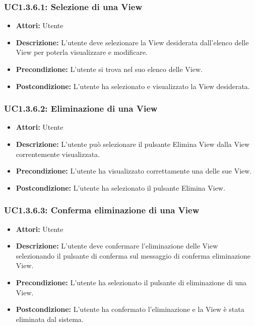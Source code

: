 \subsubsection{UC1.3.6.1: Selezione di una View}

\begin{itemize}
    \item \textbf{Attori:} Utente
    \item \textbf{Descrizione:} L'utente deve selezionare la View desiderata dall'elenco delle View per poterla visualizzare e modificare.
    \item \textbf{Precondizione:} L'utente si trova nel suo elenco delle View.
    \item \textbf{Postcondizione:} L'utente ha selezionato e visualizzato la View desiderata.
\end{itemize}

\subsubsection{UC1.3.6.2: Eliminazione di una View}

\begin{itemize}
    \item \textbf{Attori:} Utente
    \item \textbf{Descrizione:} L'utente può selezionare il pulsante Elimina View dalla View correntemente visualizzata.
    \item \textbf{Precondizione:} L'utente ha visualizzato correttamente una delle sue View.
    \item \textbf{Postcondizione:} L'utente ha selezionato il pulsante Elimina View.
\end{itemize}

\subsubsection{UC1.3.6.3: Conferma eliminazione di una View}

\begin{itemize}
    \item \textbf{Attori:} Utente
    \item \textbf{Descrizione:} L'utente deve confermare l'eliminazione delle View selezionando il pulsante di conferma sul messaggio di conferma eliminazione View.
    \item \textbf{Precondizione:} L'utente ha selezionato il pulsante di eliminazione di una View.
    \item \textbf{Postcondizione:} L'utente ha confermato l'eliminazione e la View è stata eliminata dal sistema.
\end{itemize}

